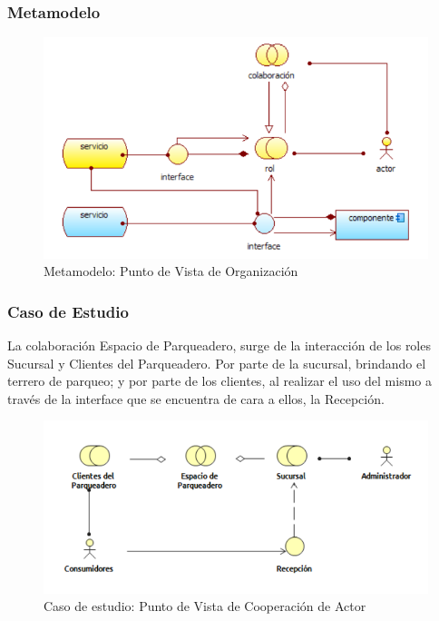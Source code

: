 \subsubsection{Metamodelo}
\begin{figure}[H]
	\centering
	\includegraphics[width=1.0\textwidth]{imagenes/Metamodelos/Negocio/meta_cooperacion_actor.png}
	\caption{Metamodelo: Punto de Vista de Organización}
	\label{fig:gap_analysis}
\end{figure}




\subsubsection{Caso de Estudio}
La colaboración Espacio de Parqueadero, surge de la interacción de los roles Sucursal y Clientes del Parqueadero. Por parte de la sucursal, brindando el terrero de parqueo; y por parte de los clientes, al realizar el uso del mismo a través de la interface que se encuentra de cara a ellos, la Recepción.
\begin{figure}[H]
	\centering
	\includegraphics[width=1.0\textwidth]{imagenes/Caso_estudio/Negocio/CopActor.PDF}
	\caption{Caso de estudio: Punto de Vista de Cooperación de Actor}
	\label{fig:gap_analysis}
\end{figure}










